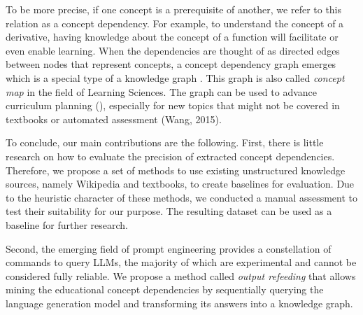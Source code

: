 \documentclass{article}
\begin{document}

To be more precise, if one concept is a prerequisite of another, we refer to this relation as a concept dependency. For example, to understand the concept of a derivative, having knowledge about the concept of a function will facilitate or even enable learning. When the dependencies are thought of as directed edges between nodes that represent concepts, a concept dependency graph emerges which is a special type of a knowledge graph \citep{wang2016using}. This graph is also called \textit{concept map} in the field of Learning Sciences.
The graph can be used to advance curriculum planning (\cite{yang2015concept}), especially for new topics that might not be covered in textbooks or automated assessment (Wang, 2015).


To conclude, our main contributions are the following.
First, there is little research on how to evaluate the precision of extracted concept dependencies. Therefore, we propose a set of methods to use existing unstructured knowledge sources, namely Wikipedia and textbooks, to create baselines for evaluation. Due to the heuristic character of these methods, we conducted a manual assessment to test their suitability for our purpose. The resulting dataset can be used as a baseline for further research.

Second, the emerging field of prompt engineering provides a constellation of commands to query LLMs, the majority of which are experimental and cannot be considered fully reliable. We propose a method called \textit{output refeeding} that allows mining the educational concept dependencies by sequentially querying the language generation model and transforming its answers into a knowledge graph.
\end{document}

